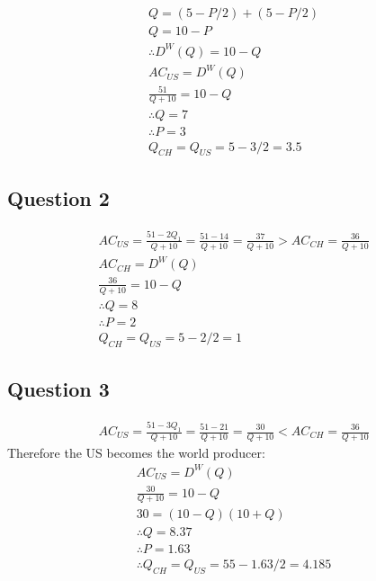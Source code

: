 \documentclass{article}
\begin{document}
\begin{gather*}
  Q = (5-P/2) + (5-P/2) \\
  Q = 10 - P \\
  \therefore D^{W}(Q) = 10 - Q \\
  AC_{US} = D^{W}(Q) \\
  \frac{51}{Q+10} = 10 - Q \\
  \therefore Q = 7 \\
  \therefore P = 3 \\
  Q_{CH} = Q_{US} = 5 - 3/2 = 3.5
\end{gather*}

\par \vspace{0.8em}
\subsection{Question 2}

\begin{gather*}
  AC_{US} = \frac{51 - 2Q_{1}}{Q + 10} = \frac{51 - 14}{Q + 10} = \frac{37}{Q + 10} > AC_{CH} = \frac{36}{Q + 10} \\
  AC_{CH} = D^{W}(Q) \\
  \frac{36}{Q+10} = 10 - Q \\
  \therefore Q = 8 \\
  \therefore P = 2 \\
  Q_{CH} = Q_{US} = 5 - 2/2 = 1
\end{gather*}

\par \vspace{0.8em}
\subsection{Question 3}

\begin{gather*}
  AC_{US} = \frac{51 - 3Q_{1}}{Q + 10} = \frac{51 - 21}{Q + 10} = \frac{30}{Q + 10} < AC_{CH} = \frac{36}{Q + 10}
\end{gather*}
Therefore the US becomes the world producer:
\begin{gather*}
  AC_{US} = D^{W}(Q) \\
  \frac{30}{Q+10} = 10 - Q \\
  30 = (10 - Q) (10 + Q) \\
  \therefore Q = 8.37 \\
  \therefore P = 1.63 \\
  \therefore Q_{CH} = Q_{US} = 55 - 1.63/2 = 4.185
\end{gather*}
\end{document}
